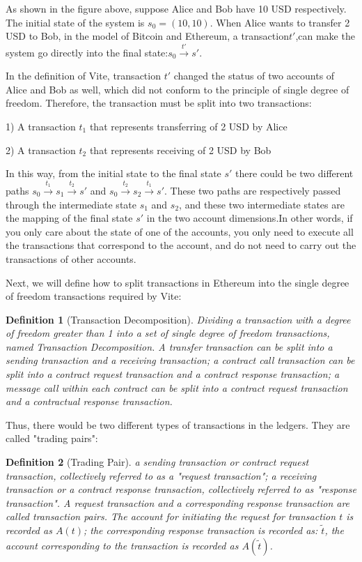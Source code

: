 \documentclass[UTF8,nofonts]{article}
\newtheorem{definition}{Definition}[section]
\begin{document}
\begin{multicols}{2}
As shown in the figure above, suppose Alice and Bob  have 10 USD respectively. The initial state of the system is $s_{0} = (10, 10)$. When Alice wants to transfer 2 USD to Bob, in the model of  Bitcoin and Ethereum, a transaction${t}'$,can make the system go directly into the final state:$s_{0} \overset{{t}'}{\rightarrow}{s}'$.

In the definition of Vite, transaction ${t}'$ changed the status of two accounts of Alice and Bob as well, which did not conform to the principle of single degree of freedom. Therefore, the transaction must be split into two transactions:

1) A transaction $t_{1}$ that represents transferring of 2 USD by Alice

2) A transaction $t_{2}$ that represents receiving of 2 USD by Bob 

In this way, from the initial state to the final state ${s}'$ there could be two different paths $s_{0} \overset{t_{1}}{\rightarrow} s_{1} \overset{t_{2}}{\rightarrow} {s}'$ and $s_{0} \overset{t_{2}}{\rightarrow} s_{2} \overset{t_{1}}{\rightarrow} {s}'$. These two paths are respectively passed through the intermediate state $s_{1}$ and $s_{2}$, and these two intermediate states are the mapping of the final state ${s}'$ in the two account dimensions.In other words, if you only care about the state of one of the accounts, you only need to execute all the transactions that correspond to the account, and do not need to carry out the transactions of other accounts.

Next, we will define how to split transactions in Ethereum into the single degree of freedom transactions required by Vite:
\begin{definition}[Transaction Decomposition]
Dividing a transaction with a degree of freedom greater than 1 into a set of single degree of freedom transactions, named Transaction Decomposition. A transfer transaction can be split into a sending transaction and a receiving transaction; a contract call transaction can be split into a contract request transaction and a contract response transaction; a message call within each contract can be split into a contract request transaction and a contractual response transaction.
\end{definition}

Thus, there would be two different types of transactions in the ledgers. They are called "trading pairs":
\begin{definition}[Trading Pair]
a sending transaction or contract request transaction, collectively referred to as a "request transaction"; a receiving transaction or a contract response transaction, collectively referred to as "response transaction". A request transaction and a corresponding response transaction are called transaction pairs. The account for initiating the request for transaction $t$  is recorded as  $A(t)$; the corresponding response transaction is recorded as: $\widetilde{t}$, the account corresponding to the transaction is recorded as  $A(\widetilde{t})$.
\end{definition}


\end{multicols}
\end{document}
